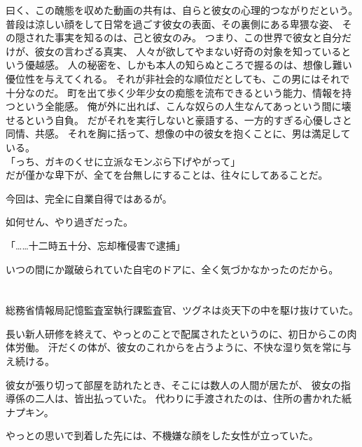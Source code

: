 \documentclass[../NenokuniMain]{subfiles}
\begin{document}
曰く、この醜態を収めた動画の共有は、自らと彼女の心理的つながりだという。
普段は涼しい顔をして日常を過ごす彼女の表面、その裏側にある卑猥な姿、
その隠された事実を知るのは、己と彼女のみ。
つまり、この世界で彼女と自分だけが、彼女の言わざる真実、
人々が欲してやまない好奇の対象を知っているという優越感。
人の秘密を、しかも本人の知らぬところで握るのは、想像し難い優位性を与えてくれる。
それが非社会的な順位だとしても、この男にはそれで十分なのだ。
町を出て歩く少年少女の痴態を流布できるという能力、情報を持つという全能感。
俺が外に出れば、こんな奴らの人生なんてあっという間に壊せるという自負。
だがそれを実行しないと豪語する、一方的すぎる心優しさと同情、共感。
それを胸に括って、想像の中の彼女を抱くことに、男は満足している。\\
「っち、ガキのくせに立派なモンぶら下げやがって」\\

だが僅かな卑下が、全てを台無しにすることは、往々にしてあることだ。

今回は、完全に自業自得ではあるが。

如何せん、やり過ぎだった。

「……十二時五十分、忘却権侵害で逮捕」

いつの間にか蹴破られていた自宅のドアに、全く気づかなかったのだから。

\section{}

総務省情報局記憶監査室執行課監査官、ツグネは炎天下の中を駆け抜けていた。

長い新人研修を終えて、やっとのことで配属されたというのに、初日からこの肉体労働。
汗だくの体が、彼女のこれからを占うように、不快な湿り気を常に与え続ける。

彼女が張り切って部屋を訪れたとき、そこには数人の人間が居たが、
彼女の指導係の二人は、皆出払っていた。
代わりに手渡されたのは、住所の書かれた紙ナプキン。

やっとの思いで到着した先には、不機嫌な顔をした女性が立っていた。
\end{document}
